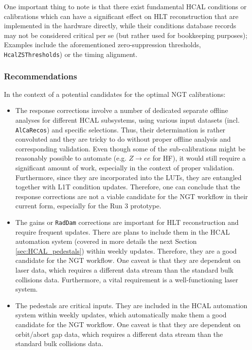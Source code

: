 One important thing to note is that there exist fundamental HCAL conditions or calibrations which can have a significant effect on HLT reconstruction that are implemented in the hardware directly,  while their conditions database records may not be considered critical per se (but rather used for bookkeeping purposes); Examples include the aforementioned zero-suppression thresholds, \texttt{HcalZSThresholds}) or the timing alignment.

\subsubsection{Recommendations}

In the context of a potential candidates for the optimal NGT calibrations:
\begin{itemize}
    \item The response corrections involve a number of dedicated separate offline analyses for different HCAL subsystems, using various input datasets (incl. \texttt{AlCaRecos}) and specific selections. Thus, their determination is rather convoluted and they are tricky to do without proper offline analysis and corresponding validation. Even though some of the sub-calibrations might be reasonably possible to automate (e.g. $Z \rightarrow ee$ for HF), it would still require a significant amount of work, especially in the context of proper validation. Furthermore, since they are incorporated into the LUTs, they are entangled together with L1T condition updates. Therefore, one can conclude that the response corrections are not a viable candidate for the NGT workflow in their current form, especially for the Run 3 prototype.
    \item The gains or \texttt{RadDam} corrections are important for HLT reconstruction and require frequent updates. There are plans to include them in the HCAL automation system (covered in more details the next Section \ref{sec:HCAL_pedestals}) within weekly updates. Therefore, they are a good candidate for the NGT workflow. One caveat is that they are dependent on laser data, which requires a different data stream than the standard bulk collisions data. Furthermore, a vital requirement is a well-functioning laser system.
    \item The pedestals are critical inputs. They are included in the HCAL automation system within weekly updates, which automatically make them a good candidate for the NGT workflow. One caveat is that they are dependent on orbit/abort gap data, which requires a different data stream than the standard bulk collisions data.
\end{itemize}

